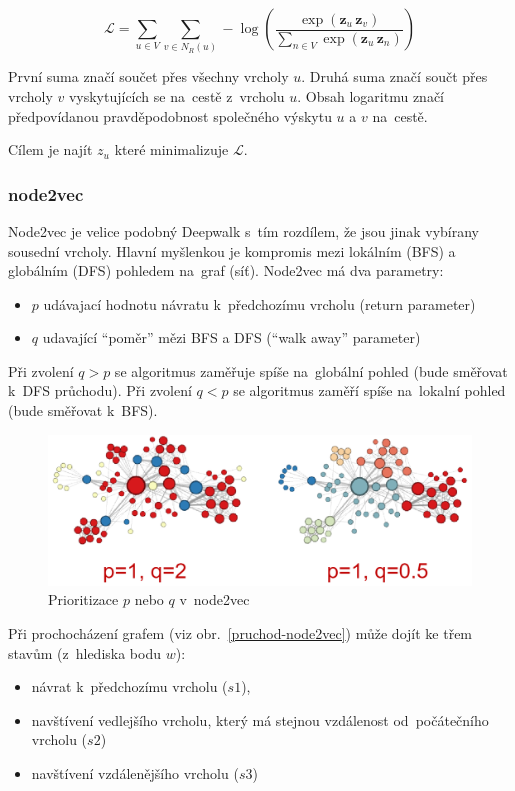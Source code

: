 $$\mathcal{L} = \sum_{u\in V} \sum_{v\in N_R (u)} - \log(\frac{\exp(\mathbf{z}_{u}\,\mathbf{z}_{v})}{\sum_{n\in V} \exp(\mathbf{z}_{u}\,\mathbf{z}_{n})})$$

První suma značí součet přes všechny vrcholy $u$.
Druhá suma značí součt přes vrcholy $v$ vyskytujících se na~cestě z~vrcholu $u$.
Obsah logaritmu značí předpovídanou pravděpodobnost společného výskytu $u$ a $v$ na~cestě.

Cílem je najít $z_u$ které minimalizuje $\mathcal{L}$.


\subsubsection{node2vec}

Node2vec je velice podobný Deepwalk s~tím rozdílem, že jsou jinak vybírany sousední vrcholy.
Hlavní myšlenkou je kompromis mezi lokálním (BFS) a globálním (DFS) pohledem na~graf (síť).
Node2vec má dva parametry:
\begin{itemize}
	\item $p$ udávajací hodnotu návratu k~předchozímu vrcholu (return parameter)
	\item $q$ udavající \enquote{poměr} mězi BFS a DFS (\enquote{walk away} parameter)
\end{itemize}

Při zvolení $q>p$ se algoritmus zaměřuje spíše na~globální pohled (bude směřovat k~DFS průchodu). Při zvolení $q<p$ se algoritmus zaměří spíše na~lokalní pohled (bude směřovat k~BFS).

\begin{figure}[ht]
    \centering
	\includegraphics[width=\textwidth]{images/11_node2vec-pq}
    \caption{Prioritizace $p$ nebo $q$ v~node2vec}
\end{figure}

Při prochocházení grafem (viz obr.~\ref{pruchod-node2vec}) může dojít ke třem stavům (z~hlediska bodu $w$):
\begin{itemize}
	\item návrat k~předchozímu vrcholu ($s1$),
	\item navštívení vedlejšího vrcholu, který má stejnou vzdálenost od~počátečního vrcholu ($s2$)
	\item navštívení vzdálenějšího vrcholu ($s3$)
\end{itemize}

